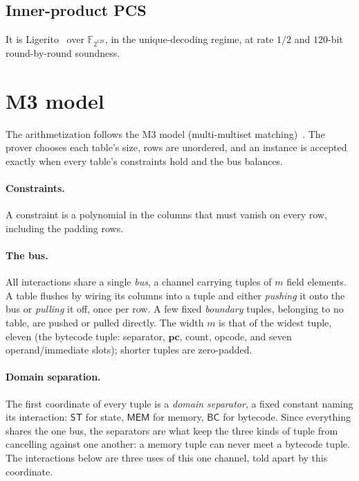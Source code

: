 \documentclass[11pt]{article}
\newcommand{\F}{\mathbb{F}}
\newcommand{\pc}{\mathbf{pc}}
\newcommand{\dsep}[1]{\mathsf{#1}}
\begin{document}
\subsection{Inner-product PCS}\label{sec:rs-dense}

It is Ligerito~\cite{cryptoeprint:2025/1187} over $\F_{2^{128}}$, in the unique-decoding regime, at rate $1/2$ and $120$-bit round-by-round soundness.

\section{M3 model}\label{sec:m3}

The arithmetization follows the M3 model (multi-multiset matching)~\cite{m3}. The prover chooses each table's size, rows are unordered, and an instance is accepted exactly when every table's constraints hold and the bus balances.

\paragraph{Constraints.} A constraint is a polynomial in the columns that must vanish on every row, including the padding rows.

\paragraph{The bus.} All interactions share a single \emph{bus}, a channel carrying tuples of $m$ field elements. A table flushes by wiring its columns into a tuple and either \emph{pushing} it onto the bus or \emph{pulling} it off, once per row. A few fixed \emph{boundary} tuples, belonging to no table, are pushed or pulled directly. The width $m$ is that of the widest tuple, eleven (the bytecode tuple: separator, $\pc$, count, opcode, and seven operand/immediate slots); shorter tuples are zero-padded.

\paragraph{Domain separation.} The first coordinate of every tuple is a \emph{domain separator}, a fixed constant naming its interaction: $\dsep{ST}$ for state, $\dsep{MEM}$ for memory, $\dsep{BC}$ for bytecode. Since everything shares the one bus, the separators are what keep the three kinds of tuple from cancelling against one another: a memory tuple can never meet a bytecode tuple. The interactions below are three uses of this one channel, told apart by this coordinate.
\end{document}
